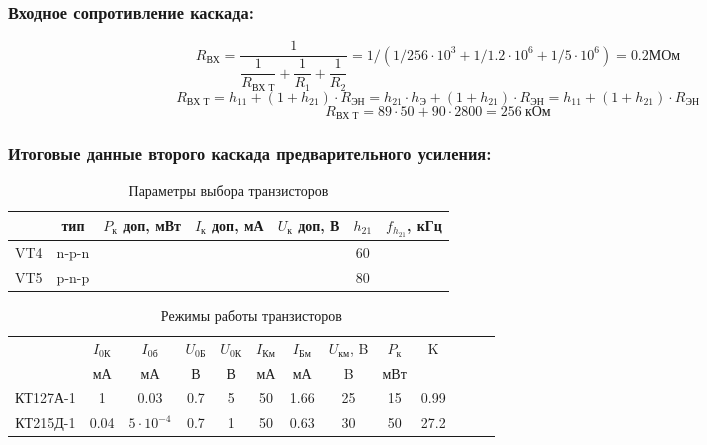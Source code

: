 \subsubsection{Входное сопротивление каскада:}
\begin{equation}
   \label{eq:equation6_21}
R_{\text{ВХ}}=\dfrac{1}{\dfrac{1}{R_\text{ВХ Т}}+\dfrac{1}{R_1}+\dfrac{1}{R_2}}=1/(1/256 \cdot 10^3 +1/1.2 \cdot 10^6 + 1/5 \cdot 10^6)=0.2\text{МОм}
\end{equation}
\begin{equation}
   \label{eq:equation6_22}
R_{\text{ВХ Т}}=h_{11}+(1+h_{21})\cdot R_{\text{ЭН}}=h_{21} \cdot h_{\text{Э}}+(1+h_{21}) \cdot R_{\text{ЭН}}=h_{11}+(1+h_{21}) \cdot R_{\text{ЭН}}
\end{equation}
\begin{equation*}
R_{\text{ВХ Т}}=89 \cdot 50+90 \cdot 2800 =256~\text{кОм}
\end{equation*}

\subsubsection{Итоговые данные второго каскада предварительного усиления:}


\begin{table}[htbp]
\caption{Параметры выбора транзисторов }
\begin{center}\begin{tabular}{|c|c|c|c|c|c|c|}
\hline 
  & тип & $P_{\text{к}}$ доп, мВт & $I_{\text{к}}$ доп, мА & $U_{\text{к}}$ доп, В & $h_{21}$ &  $f_{h_{21}}$, кГц \\ 
\hline 
VT4 & n-p-n &   &  &  & 60 & \\ 
\hline 
VT5 & p-n-p &   &  &  & 80 &  \\ 
\hline 
\end{tabular} 
\end{center}
\end{table}

\begin{table}[htbp]
\caption{Режимы работы транзисторов}
\begin{center}\begin{tabular}{|c|c|c|c|c|c|c|c|c|c|c|c|c|}
\hline 
   & $I_\text{0К}$ & $I_\text{0б}$& $U_\text{0Б}$ & $U_\text{0К}$&  $I_{\text{Км}}$  & $I_{\text{Бм}}$& $U_{\text{км}}$, B & $P_{\text{к}}$ & K\\ 
  & мА & мА& В & В & мА & мА & B & мВт & \\
\hline 
КТ127А-1 & 1 & 0.03 & 0.7 & 5 & 50 & 1.66 & 25 & 15 & 0.99 \\
\hline 
КТ215Д-1 & 0.04 & $5\cdot10^{-4}$  & 0.7 & 1 & 50 & 0.63 & 30 & 50 & 27.2 \\
\hline
\end{tabular} 
\end{center}
\end{table}

